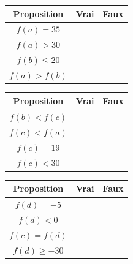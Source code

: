 {	\begin{center}
\def\arraystretch{1.5}
\setlength\tabcolsep{6pt}
	\begin{tabular}{|c|c|c|} \hline
		Proposition & Vrai & Faux \\ \hline
		$f(a) = 35$ & & \checkmark \\ \hline
		$f(a) > 30$ & \checkmark & \\ \hline
		$f(b) \leq 20$ & \checkmark & \\ \hline
		$f(a) > f(b)$ & \checkmark & \\ \hline
	\end{tabular}	
	\hfill
	\begin{tabular}{|c|c|c|} \hline
		Proposition & Vrai & Faux \\ \hline
		$f(b) < f(c)$ & \checkmark & \\ \hline
		$f(c) < f(a)$ & \checkmark & \\ \hline
		$f(c) = 19$ & & \checkmark \\ \hline
		$f(c) < 30$ & \checkmark & \\ \hline
	\end{tabular}
	\hfill
	\begin{tabular}{|c|c|c|} \hline
		Proposition & Vrai & Faux \\ \hline
		$f(d) = -5$ & & \checkmark \\ \hline
		$f(d) < 0$ & & \checkmark \\ \hline
		$f(c) = f(d)$ & & \checkmark \\ \hline
		$f(d) \geq -30$ & \checkmark & \\ \hline
	\end{tabular}	
	\end{center}
}



\newpage
{}
\shipoutAnswer


